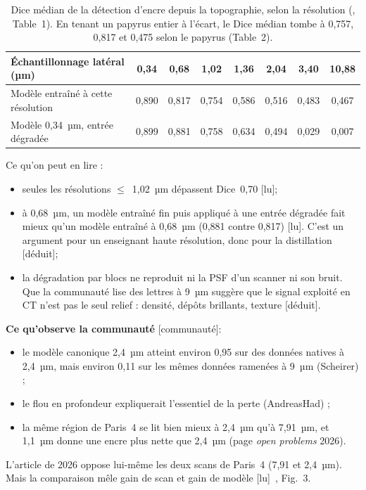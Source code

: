 \documentclass[11pt,a4paper]{article}
\newcommand{\lu}{\textsf{\small[lu]}}
\newcommand{\deduit}{\textsf{\small[déduit]}}
\newcommand{\commu}{\textsf{\small[communauté]}}
\begin{document}
\begin{table}[h]
\centering\small
\begin{tabular}{@{}lccccccc@{}}
\toprule
Échantillonnage latéral (µm) & 0,34 & 0,68 & 1,02 & 1,36 & 2,04 & 3,40 & 10,88 \\
\midrule
Modèle entraîné à cette résolution & 0,890 & 0,817 & 0,754 & 0,586 & 0,516 & 0,483 & 0,467 \\
Modèle 0,34~µm, entrée dégradée & 0,899 & 0,881 & 0,758 & 0,634 & 0,494 & 0,029 & 0,007 \\
\bottomrule
\end{tabular}
\caption{Dice médian de la détection d'encre depuis la topographie, selon la résolution
(\cite{angelotti2026topo}, Table~1). En tenant un papyrus entier à l'écart, le Dice médian
tombe à 0,757, 0,817 et 0,475 selon le papyrus (Table~2).}
\label{tab:topo}
\end{table}

\noindent Ce qu'on peut en lire :
\begin{itemize}
  \item seules les résolutions $\le$~1,02~µm dépassent Dice~0,70 \lu ;
  \item à 0,68~µm, un modèle entraîné fin puis appliqué à une entrée dégradée fait mieux qu'un
  modèle entraîné à 0,68~µm (0,881 contre 0,817) \lu. C'est un argument pour un enseignant
  haute résolution, donc pour la distillation \deduit ;
  \item la dégradation par blocs ne reproduit ni la PSF d'un scanner ni son bruit. Que la
  communauté lise des lettres à 9~µm suggère que le signal exploité en CT n'est pas le seul
  relief : densité, dépôts brillants, texture \deduit.
\end{itemize}

\noindent \textbf{Ce qu'observe la communauté} \commu :
\begin{itemize}
  \item le modèle canonique 2,4~µm atteint environ 0,95 sur des données natives à 2,4~µm,
  mais environ 0,11 sur les mêmes données ramenées à 9~µm (Scheirer) ;
  \item le flou en profondeur expliquerait l'essentiel de la perte (AndreasHad) ;
  \item la même région de Paris~4 se lit bien mieux à 2,4~µm qu'à 7,91~µm, et 1,1~µm donne une
  encre plus nette que 2,4~µm (page \emph{open problems} 2026).
\end{itemize}
L'article de 2026 oppose lui-même les deux scans de Paris~4 (7,91 et 2,4~µm). Mais la
comparaison mêle gain de scan et gain de modèle \lu~\cite{angelotti2026complete}, Fig.~3.
\end{document}
